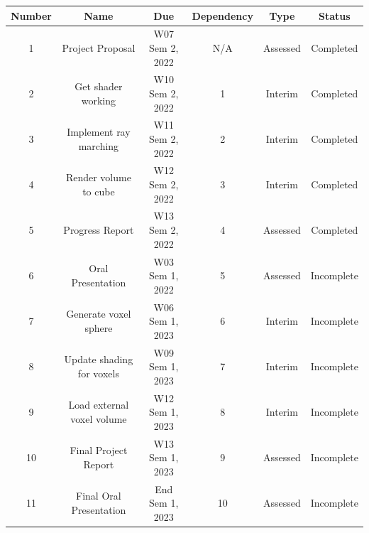 \documentclass[titlepage]{article}
\begin{document}
\begin{center}
    \begin{tabular}{|c|c|c|c|c|c|}
        \hline
        Number & Name                       & Due             & Dependency & Type     & Status     \\
        \hline
        1      & Project Proposal           & W07 Sem 2, 2022 & N/A        & Assessed & Completed  \\
        2      & Get shader working         & W10 Sem 2, 2022 & 1          & Interim  & Completed  \\
        3      & Implement ray marching     & W11 Sem 2, 2022 & 2          & Interim  & Completed  \\
        4      & Render volume to cube      & W12 Sem 2, 2022 & 3          & Interim  & Completed  \\
        5      & Progress Report            & W13 Sem 2, 2022 & 4          & Assessed & Completed  \\
        6      & Oral Presentation          & W03 Sem 1, 2022 & 5          & Assessed & Incomplete \\
        7      & Generate voxel sphere      & W06 Sem 1, 2023 & 6          & Interim  & Incomplete \\
        8      & Update shading for voxels  & W09 Sem 1, 2023 & 7          & Interim  & Incomplete \\
        9      & Load external voxel volume & W12 Sem 1, 2023 & 8          & Interim  & Incomplete \\
        10     & Final Project Report       & W13 Sem 1, 2023 & 9          & Assessed & Incomplete \\
        11     & Final Oral Presentation    & End Sem 1, 2023 & 10         & Assessed & Incomplete \\
        \hline
    \end{tabular}
\end{center}


\end{document}
